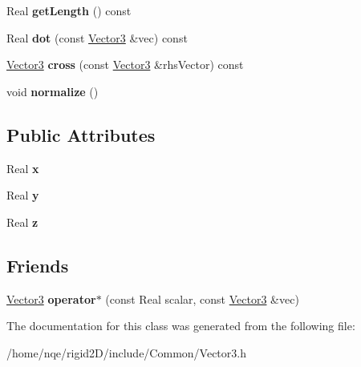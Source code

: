 \begin{DoxyCompactItemize}
\item 
\hypertarget{class_rigid2_d_1_1_vector3_a50467d65cd7df31bfba140d49fb9bae0}{
Real {\bfseries getLength} () const }
\label{class_rigid2_d_1_1_vector3_a50467d65cd7df31bfba140d49fb9bae0}

\item 
\hypertarget{class_rigid2_d_1_1_vector3_a0727319f06f41af85fb6f1ad1c4cc1ec}{
Real {\bfseries dot} (const \hyperlink{class_rigid2_d_1_1_vector3}{Vector3} \&vec) const }
\label{class_rigid2_d_1_1_vector3_a0727319f06f41af85fb6f1ad1c4cc1ec}

\item 
\hypertarget{class_rigid2_d_1_1_vector3_ad67521baac466f672ac8bf43db029d85}{
\hyperlink{class_rigid2_d_1_1_vector3}{Vector3} {\bfseries cross} (const \hyperlink{class_rigid2_d_1_1_vector3}{Vector3} \&rhsVector) const }
\label{class_rigid2_d_1_1_vector3_ad67521baac466f672ac8bf43db029d85}

\item 
\hypertarget{class_rigid2_d_1_1_vector3_a089f3df2c56a162ff55b4fd86d048cf5}{
void {\bfseries normalize} ()}
\label{class_rigid2_d_1_1_vector3_a089f3df2c56a162ff55b4fd86d048cf5}

\end{DoxyCompactItemize}
\subsection*{Public Attributes}
\begin{DoxyCompactItemize}
\item 
\hypertarget{class_rigid2_d_1_1_vector3_aada2b4af1a1ed53edd72b21c3a4f60c0}{
Real {\bfseries x}}
\label{class_rigid2_d_1_1_vector3_aada2b4af1a1ed53edd72b21c3a4f60c0}

\item 
\hypertarget{class_rigid2_d_1_1_vector3_adaa0812d1c3d6fcf762f900452cd31ff}{
Real {\bfseries y}}
\label{class_rigid2_d_1_1_vector3_adaa0812d1c3d6fcf762f900452cd31ff}

\item 
\hypertarget{class_rigid2_d_1_1_vector3_ac725721257b795f063a27226ad8d7582}{
Real {\bfseries z}}
\label{class_rigid2_d_1_1_vector3_ac725721257b795f063a27226ad8d7582}

\end{DoxyCompactItemize}
\subsection*{Friends}
\begin{DoxyCompactItemize}
\item 
\hypertarget{class_rigid2_d_1_1_vector3_add1c3cf4f0100edbe20fbf6136beeb69}{
\hyperlink{class_rigid2_d_1_1_vector3}{Vector3} {\bfseries operator$\ast$} (const Real scalar, const \hyperlink{class_rigid2_d_1_1_vector3}{Vector3} \&vec)}
\label{class_rigid2_d_1_1_vector3_add1c3cf4f0100edbe20fbf6136beeb69}

\end{DoxyCompactItemize}


The documentation for this class was generated from the following file:\begin{DoxyCompactItemize}
\item 
/home/nqe/rigid2D/include/Common/Vector3.h\end{DoxyCompactItemize}
